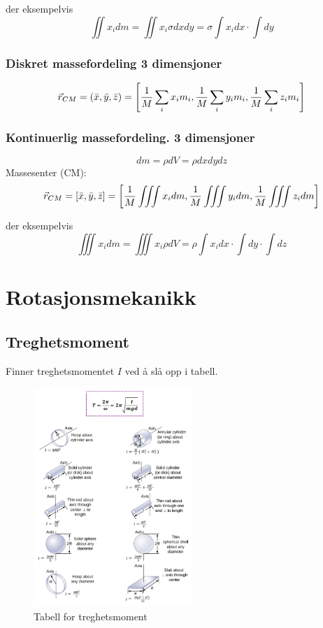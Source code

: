 \documentclass[12pt]{article}
\begin{document}
der eksempelvis
$$\iint x_i dm = \iint x_i \sigma dxdy = \sigma \int x_idx\cdot \int dy$$

\subsubsection{Diskret massefordeling 3 dimensjoner}
$$\Vec{r}_{CM} = (\Bar{x}, \Bar{y}, \Bar{z}) = \left[\frac{1}{M} \sum_i x_im_i, \frac{1}{M} \sum_i y_i m_i, \frac{1}{M} \sum_i z_i m_i \right]$$

\subsubsection{Kontinuerlig massefordeling. 3 dimensjoner}
$$dm = \rho dV = \rho dxdydz$$
Massesenter (CM):
$$\Vec{r}_{CM} = [\Bar{x}, \Bar{y}, \Bar{z}] = \left[\frac{1}{M} \iiint x_i dm, \frac{1}{M} \iiint y_idm, \frac{1}{M} \iiint z_idm \right]$$

der eksempelvis
$$\iiint x_i dm = \iiint x_i \rho dV = \rho \int x_i dx\cdot \int dy \cdot \int dz$$

\newpage
\section{Rotasjonsmekanikk}
\subsection{Treghetsmoment}
Finner treghetsmomentet $I$ ved å slå opp i tabell.
\begin{figure} [H]
    \centering
    \includegraphics[width = 6cm]{images/slow.png}
    \caption{Tabell for treghetsmoment}
\end{figure}
\end{document}
